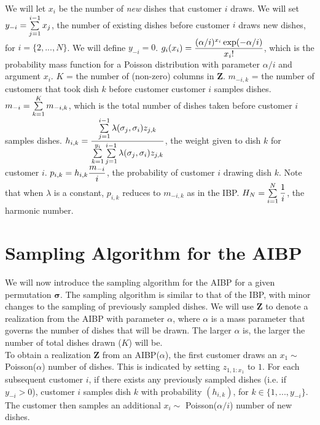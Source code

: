 \noindent
We will let $x_i$ be the number of \textit{new} dishes that customer $i$ draws.
We will set $y_{-i} = \sum\limits_{j=1}^{i-1} x_j$, the number of existing dishes
before customer $i$ draws new dishes, for $i=\{2,...,N\}$. We will define
$y_{-i} = 0$.  $g_i(x_i) = \displaystyle\frac{(\alpha/i)^{x_i}\exp(-\alpha/i)}{x_i!}$,
which is the probability mass function for a Poisson distribution with
parameter $\alpha/i$ and argument $x_i$.  $K$ = the number of (non-zero)
columns in $\bm Z$.  $m_{-i,k}$ = the number of customers that took dish $k$
before customer customer $i$ samples dishes.  $m_{-i} =
\sum\limits_{k=1}^{K}m_{-i,k}$, which is the total number of dishes taken before
customer $i$ samples dishes.  $h_{i,k} = \displaystyle\frac{\sum\limits_{j=1}^{i-1}\lambda(\sigma_j,\sigma_i)z_{j,k}} {\sum\limits_{k=1}^{y_i}\sum\limits_{j=1}^{i-1}\lambda(\sigma_j,\sigma_i)z_{j,k}}$,
the weight given to dish $k$ for customer $i$.  $p_{i,k} = h_{i,k}
\displaystyle\frac{m_{-i}}{i}$, the probability of customer $i$ drawing dish $k$. Note
that when $\lambda$ is a constant, $p_{i,k}$ reduces to $m_{-i,k}$ as in the
IBP.  $H_N = \sum\limits_{i=1}^{N} \displaystyle\frac{1}{i}$, the harmonic number.



\section{Sampling Algorithm for the AIBP}
We will now introduce the sampling algorithm for the AIBP for a given
permutation $\bm\sigma$. The sampling algorithm is similar to that of the IBP,
with minor changes to the sampling of previously sampled dishes. We will use 
$\bm Z$ to denote a realization from the AIBP with parameter $\alpha$, where 
$\alpha$ is a mass parameter that governs the number of dishes that will be drawn.
The larger $\alpha$ is, the larger the number of total dishes drawn ($K$) will be.\\

\noindent
To obtain a realization $\bm Z$ from an AIBP($\alpha$), the first customer
draws an $x_1 \sim$ Poisson($\alpha$) number of dishes. This is indicated by
setting $z_{1,1:x_1}$ to $1$. For each subsequent customer $i$, if there exists
any previously sampled dishes (i.e. if $y_{-i}>0$), customer $i$ samples dish $k$
with probability $\left(h_{i,k}\right)$, for $k \in \{1,...,y_{-i}\}$. The customer
then samples an additional $x_i \sim$ Poisson($\alpha/i$) number of new dishes. 

